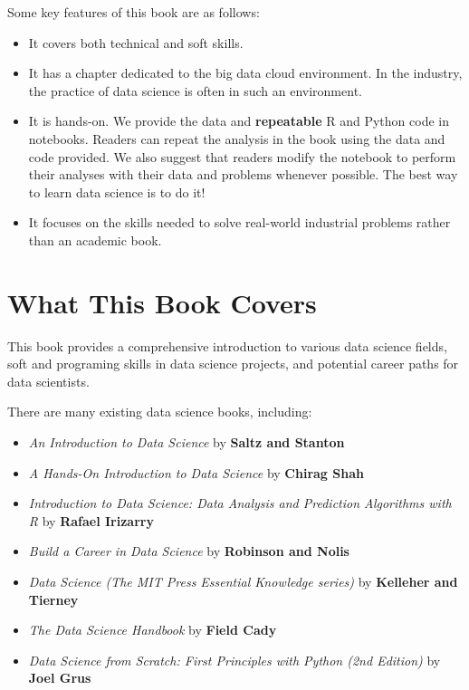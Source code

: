 \documentclass[12pt,]{krantz}
\providecommand{\tightlist}{%
  \setlength{\itemsep}{0pt}\setlength{\parskip}{0pt}}
\begin{document}
Some key features of this book are as follows:

\begin{itemize}
\item
  It covers both technical and soft skills.
\item
  It has a chapter dedicated to the big data cloud environment. In the industry, the practice of data science is often in such an environment.
\item
  It is hands-on. We provide the data and \textbf{repeatable} R and Python code in notebooks. Readers can repeat the analysis in the book using the data and code provided. We also suggest that readers modify the notebook to perform their analyses with their data and problems whenever possible. The best way to learn data science is to do it!
\item
  It focuses on the skills needed to solve real-world industrial problems rather than an academic book.
\end{itemize}

\hypertarget{what-this-book-covers}{%
\section*{What This Book Covers}\label{what-this-book-covers}}


This book provides a comprehensive introduction to various data science fields, soft and programing skills in data science projects, and potential career paths for data scientists.

There are many existing data science books, including:

\begin{itemize}
\tightlist
\item
  \emph{An Introduction to Data Science} by \textbf{Saltz and Stanton}
\item
  \emph{A Hands-On Introduction to Data Science} by \textbf{Chirag Shah}
\item
  \emph{Introduction to Data Science: Data Analysis and Prediction Algorithms with R} by
  \textbf{Rafael Irizarry}
\item
  \emph{Build a Career in Data Science} by \textbf{Robinson and Nolis}
\item
  \emph{Data Science (The MIT Press Essential Knowledge series)} by \textbf{Kelleher and Tierney}
\item
  \emph{The Data Science Handbook} by \textbf{Field Cady}
\item
  \emph{Data Science from Scratch: First Principles with Python (2nd Edition)} by \textbf{Joel Grus}
\end{itemize}
\end{document}

